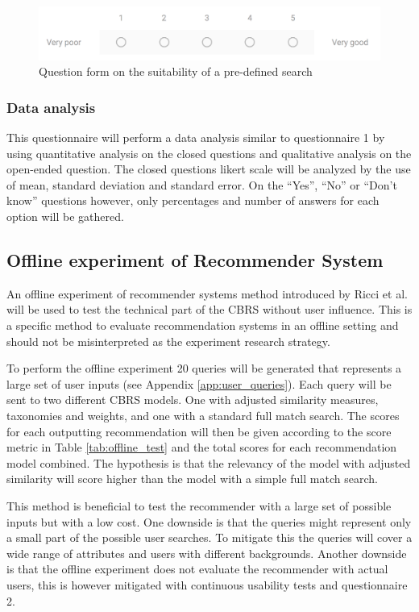 \begin{figure}[H]
    \centering
    \includegraphics[width=1\textwidth]{fig/rate_search.png}
    \caption{Question form on the suitability of a pre-defined search}
    \label{fig:q2_rate_search}
\end{figure}


\subsubsection{Data analysis}
This questionnaire will perform a data analysis similar to questionnaire 1 by using quantitative analysis on the closed questions and qualitative analysis on the open-ended question. The closed questions likert scale will be analyzed by the use of mean, standard deviation and standard error. On the \enquote{Yes}, \enquote{No} or \enquote{Don't know} questions however, only percentages and number of answers for each option will be gathered.


\subsection{Offline experiment of Recommender System}\label{sec:observation_test}
An offline experiment of recommender systems method introduced by Ricci et al.\cite{ricci2011introduction} will be used to test the technical part of the CBRS without user influence. This is a specific method to evaluate recommendation systems in an offline setting and should not be misinterpreted as the experiment research strategy.

To perform the offline experiment 20 queries will be generated that represents a large set of user inputs (see Appendix \ref{app:user_queries}). Each query will be sent to two different CBRS models. One with adjusted similarity measures, taxonomies and weights, and one with a standard full match search. The scores for each outputting recommendation will then be given according to the score metric in Table \ref{tab:offline_test} and the total scores for each recommendation model combined. The hypothesis is that the relevancy of the model with adjusted similarity will score higher than the model with a simple full match search. 

This method is beneficial to test the recommender with a large set of possible inputs but with a low cost. One downside is that the queries might represent only a small part of the possible user searches. To mitigate this the queries will cover a wide range of attributes and users with different backgrounds. Another downside is that the offline experiment does not evaluate the recommender with actual users, this is however mitigated with continuous usability tests and questionnaire 2.


